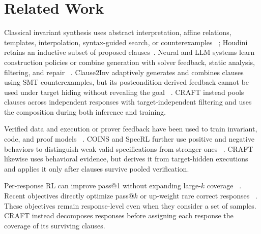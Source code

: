 \section{Related Work}\label{sec:related}

Classical invariant synthesis uses abstract interpretation, affine relations,
templates, interpolation, syntax-guided search, or counterexamples
~\citep{cousot1977abstract,karr1976affine,mcmillan2003interpolation,
alur2013sygus,garg2014ice}; Houdini retains an inductive subset of proposed
clauses~\citep{flanagan2001houdini}.  Neural and LLM systems learn construction
policies or combine generation with solver feedback, static analysis,
filtering, and repair
~\citep{si2018learning,si2020code2inv,ryan2020cln2inv,yao2020gcln,
yu2023lipus,kamath2023finding,chakraborty2023ranking,cao2025clause2inv,
wu2024lam4inv,liu2024acinv,wen2024enchanting,ma2024specgen,yang2026sespec,
wu2024lemur,first2023baldur}.  Clause2Inv adaptively generates and combines
clauses using SMT counterexamples, but its postcondition-derived feedback
cannot be used under target hiding without revealing the goal
~\citep{cao2025clause2inv}.  CRAFT instead pools clauses across independent
responses with target-independent filtering and uses the composition during
both inference and training.

Verified data and execution or prover feedback have been used to train
invariant, code, and proof models
~\citep{wei2025invbench,pinto2026notall,le2022coderl,yan2025reform}.
COINS and SpecRL further use positive and negative behaviors to distinguish
weak valid specifications from stronger ones
~\citep{yang2026coins,huang2026specrl}.  CRAFT likewise uses behavioral
evidence, but derives it from target-hidden executions and applies it only
after clauses survive pooled verification.

Per-response RL can improve pass@1 without expanding large-\(k\) coverage
~\citep{yue2025rlcapacity,he2025unlikeliness}.  Recent objectives directly
optimize pass@\(k\) or up-weight rare correct responses
~\citep{walder2025pkpo,chen2025passktraining,he2025unlikeliness}.  These
objectives remain response-level even when they consider a set of samples.
CRAFT instead decomposes responses before assigning each response the coverage
of its surviving clauses.
